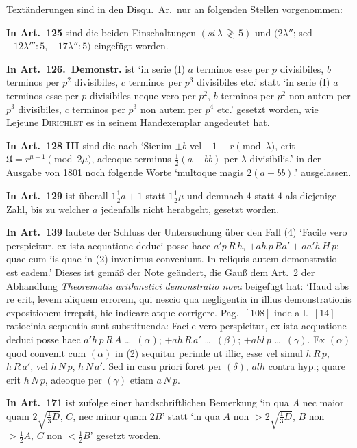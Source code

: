 \documentclass[12pt,a4paper]{article}
\theoremstyle{plain}
\theoremstyle{definition}
\theoremstyle{remark}
\begin{document}
Text\"anderungen sind in den Disqu.\ Ar.\ nur an folgenden Stellen vorgenommen:

\textbf{In Art.\ 125} sind die beiden Einschaltungen $(si\,\lambda\,\gtrless\,5)$ und $(2\lambda''$; sed $-12\lambda''' : 5$, $-17\lambda'' : 5)$ eingef\"ugt worden.

\textbf{In Art.\ 126.\ Demonstr.} ist `in serie (I) $a$ terminos esse per $p$ divisibiles, $b$ terminos per $p^2$ divisibiles, $c$ terminos per $p^3$ divisibiles etc.' statt `in serie (I) $a$ terminos esse per $p$ divisibiles neque vero per $p^2$, $b$ terminos per $p^2$ non autem per $p^3$ divisibiles, $c$ terminos per $p^3$ non autem per $p^4$ etc.' gesetzt worden, wie Lejeune \textsc{Dirichlet} es in seinem Handexemplar angedeutet hat.

\textbf{In Art.\ 128 III} sind die nach `Sienim $\pm b$ vel $-1 \equiv r \pmod{\lambda}$, erit $\mathfrak{U} = r^{\mu-1} \pmod{2\mu}$, adeoque terminus $\tfrac{1}{2}(a - bb)$ per $\lambda$ divisibilis.' in der Ausgabe von 1801 noch folgende Worte `multoque magis $2(a-bb)$.' ausgelassen.

\textbf{In Art.\ 129} ist \"uberall $1\frac{1}{2}a + 1$ statt $1\frac{1}{2}\mu$ und demnach $4$ statt $4$ als diejenige Zahl, bis zu welcher $a$ jedenfalls nicht herabgeht, gesetzt worden.

\textbf{In Art.\ 139} lautete der Schluss der Untersuchung \"uber den Fall (4) `Facile vero perspicitur, ex ista aequatione deduci posse haec $a'p\,R\,h$, $+ah\,p\,Ra' + aa'h\,H\,p$; quae cum iis quae in (2) invenimus conveniunt. In reliquis autem demonstratio est eadem.' Dieses ist gem\"a\ss{} der Note ge\"andert, die Gau\ss{} dem Art.\ 2 der Abhandlung \textit{Theorematis arithmetici demonstratio nova} beigef\"ugt hat: `Haud abs re erit, levem aliquem errorem, qui nescio qua negligentia in illius demonstrationis expositionem irrepsit, hic indicare atque corrigere. Pag.\ $[108]$ inde a l.\ $[14]$ ratiocinia sequentia sunt substituenda: Facile vero perspicitur, ex ista aequatione deduci posse haec $a'h\,p\,R\,A$ \ldots\ $(\alpha)$; $+ah\,R\,a'$ \ldots\ $(\beta)$; $+ahl\,p$ \ldots\ $(\gamma)$. Ex $(\alpha)$ quod convenit cum $(\alpha)$ in (2) sequitur perinde ut illic, esse vel simul $h\,R\,p$, $h\,R\,a'$, vel $h\,N\,p$, $h\,N\,a'$. Sed in casu priori foret per $(\delta)$, $alh$ contra hyp.; quare erit $h\,N\,p$, adeoque per $(\gamma)$ etiam $a\,N\,p$.

\textbf{In Art.\ 171} ist zufolge einer handschriftlichen Bemerkung `in qua $A$ nec maior quam $2\sqrt{\tfrac{1}{3}D}$, $C$, nec minor quam $2B$' statt `in qua $A$ non $> 2\sqrt{\tfrac{1}{3}D}$, $B$ non $> \tfrac{1}{2}A$, $C$ non $< \tfrac{1}{2}B$' gesetzt worden.
\end{document}
